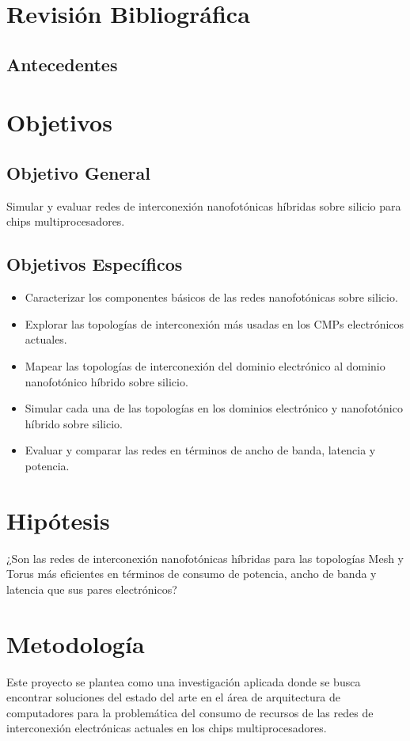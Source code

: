 \section{Revisión Bibliográfica}
\subsection*{Antecedentes}

\section{Objetivos}
\subsection{Objetivo General}
Simular y evaluar redes de interconexión nanofotónicas híbridas 
sobre silicio para chips multiprocesadores.

\subsection{Objetivos Específicos}
\begin{itemize}
\item Caracterizar los componentes básicos de las redes nanofotónicas sobre silicio.
\item Explorar las topologías de interconexión más usadas en los CMPs electrónicos actuales.
\item Mapear las topologías de interconexión del dominio electrónico al dominio nanofotónico híbrido sobre silicio.
\item Simular cada una de las topologías en los dominios electrónico y nanofotónico híbrido sobre silicio.
\item Evaluar y comparar las redes en términos de ancho de banda, latencia y potencia.
\end{itemize} 

\section{Hipótesis}
¿Son las redes de interconexión nanofotónicas híbridas para las
topologías Mesh y Torus más eficientes en términos de consumo de potencia,
ancho de banda y latencia que sus pares electrónicos?

\section{Metodología}
Este proyecto se plantea como una investigación aplicada donde se busca 
encontrar soluciones del estado del arte en el área de arquitectura de 
computadores para la problemática del consumo de recursos de las redes de 
interconexión electrónicas actuales en los chips multiprocesadores. 

